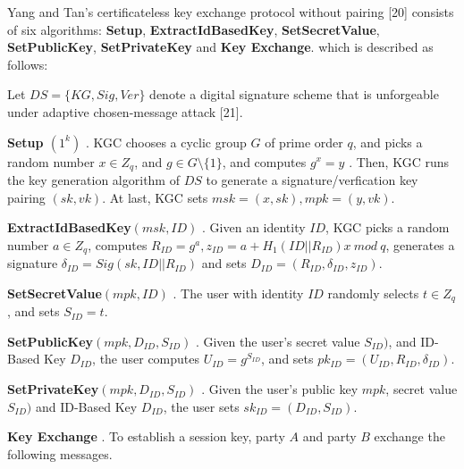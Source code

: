 \documentclass[final,1p,times,twocolumn]{elsarticle}
\begin{document}
\vspace{0.1cm}

Yang and Tan's certificateless key exchange protocol without pairing [20] consists of six algorithms: {\bf Setup}, {\bf ExtractIdBasedKey}, {\bf SetSecretValue}, {\bf SetPublicKey}, {\bf SetPrivateKey} and {\bf Key Exchange}. which is described as follows:

\vspace{0.1cm}

Let $DS= \{ KG,Sig,Ver \}$ denote a digital signature scheme that is unforgeable under adaptive chosen-message attack [21].

\vspace{0.1cm}

{\bf Setup $(1^{k})$ }. KGC chooses a cyclic group $G$ of prime order $q$, and picks a random number $x \in Z_{q}$, and $g \in G \setminus \{1\} $, and computes $g^{x}=y$ . Then, KGC runs the key generation algorithm of $DS$ to generate a signature/verfication key pairing $(sk,vk)$. At last, KGC sets $msk=(x,sk),mpk=(y,vk)$.

\vspace{0.2cm}

{\bf ExtractIdBasedKey$(msk,ID)$ }. Given an identity $ID$, KGC picks a random number $a\in Z_{q}$, computes $R_{ID}=g^{a},z_{ID}=a+H_{1}(ID||R_{ID})x\ mod\ q$, generates a signature $\delta_{ID}=Sig(sk,ID||R_{ID})$ and sets $D_{ID}=(R_{ID},\delta_{ID},z_{ID})$.

\vspace{0.2cm}

{\bf SetSecretValue$(mpk,ID)$ }. The user with identity $ID$ randomly selects $t\in Z_{q}$, and sets $S_{ID}=t$.

\vspace{0.2cm}

{\bf SetPublicKey$(mpk,D_{ID},S_{ID})$ }. Given the user's secret value $S_{ID})$, and ID-Based Key $D_{ID}$, the user computes $U_{ID}=g^{S_{ID}}$, and sets $pk_{ID}=(U_{ID},R_{ID},\delta _{ID})$.

\vspace{0.2cm}

{\bf SetPrivateKey$(mpk,D_{ID},S_{ID})$ }. Given the  user's public key $mpk$, secret value $S_{ID})$ and ID-Based Key $D_{ID}$, the user sets $sk_{ID}=(D_{ID},S_{ID})$.

\vspace{0.2cm}

{\bf Key Exchange }. To establish a session key, party $A$ and party $B$ exchange the following messages.
\end{document}
